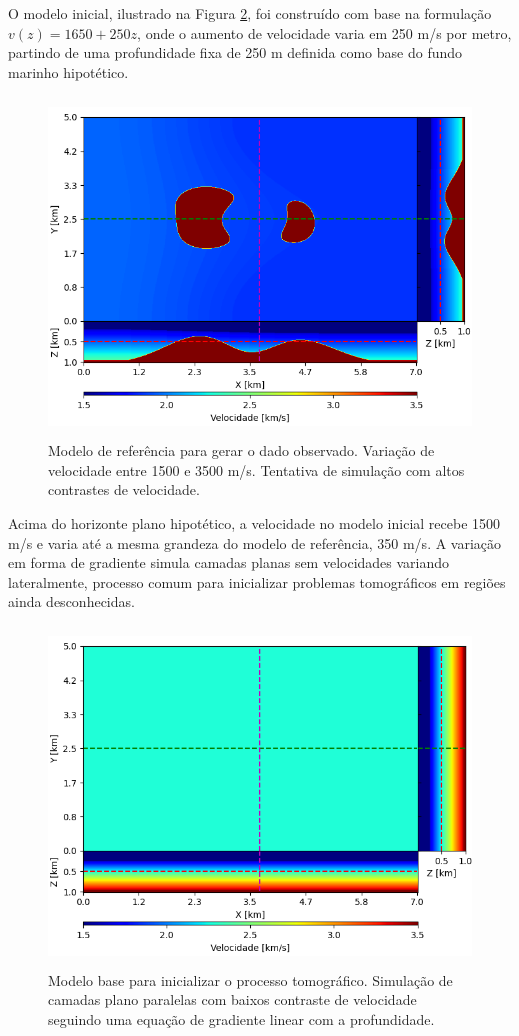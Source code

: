 O modelo inicial, ilustrado na Figura \ref{fig:init_model}, foi construído com base na formulação $v(z) = 1650 + 250z$, onde o aumento de velocidade varia em 250 m/s por metro, partindo de uma profundidade fixa de 250 m definida como base do fundo marinho hipotético.  
\begin{figure}[H]
	\centering
	\includegraphics[width=12cm,height=9cm]{Imgs/Metodologia/true_model.png}
	\caption{Modelo de referência para gerar o dado observado. Variação de velocidade entre 1500 e 3500 m/s. Tentativa de simulação com altos contrastes de velocidade.}
	\label{fig:true_model}	
\end{figure}
Acima do horizonte plano hipotético, a velocidade no modelo inicial recebe 1500 m/s e varia até a mesma grandeza do modelo de referência, 350 m/s. A variação em forma de gradiente simula camadas planas sem velocidades variando lateralmente, processo comum para inicializar problemas tomográficos em regiões ainda desconhecidas. 
\begin{figure}[H]
	\centering
	\includegraphics[width=12cm,height=9cm]{Imgs/Metodologia/init_model.png}
	\caption{Modelo base para inicializar o processo tomográfico. Simulação de camadas plano paralelas com baixos contraste de velocidade seguindo uma equação de gradiente linear com a profundidade.}
	\label{fig:init_model}	
\end{figure}

